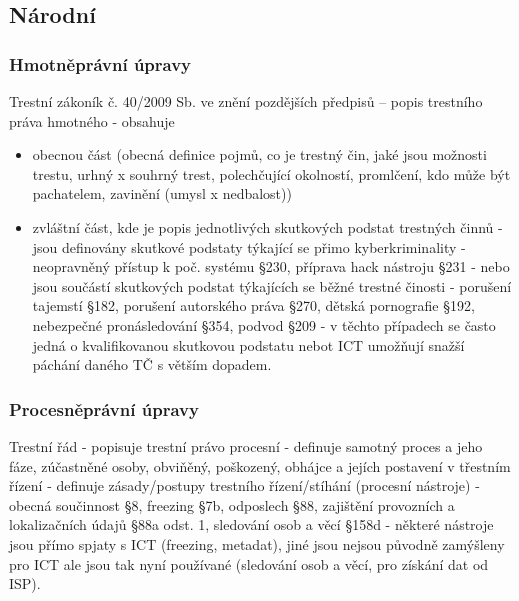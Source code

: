 \subsection{Národní}
\subsubsection{Hmotněprávní úpravy}
Trestní zákoník č. 40/2009 Sb. ve znění pozdějších předpisů -- popis trestního práva hmotného - obsahuje
\begin{itemize}
    \item obecnou část (obecná definice pojmů, co je trestný
čin, jaké jsou možnosti trestu, urhný x souhrný trest, polechčující okolností, promlčení, kdo může
být pachatelem, zavinění (umysl x nedbalost))
    \item zvláštní část, kde je popis jednotlivých
skutkových podstat trestných činnů - jsou definovány skutkové podstaty týkající se přimo
kyberkriminality - neopravněný přístup k poč. systému §230, příprava hack nástroju §231 - nebo
jsou součástí skutkových podstat týkajících se běžné trestné činosti - porušení tajemstí §182,
porušení autorského práva §270, dětská pornografie §192, nebezpečné pronásledování §354,
podvod §209 - v těchto případech se často jedná o kvalifikovanou skutkovou podstatu nebot ICT
umožňují snažší páchání daného TČ s větším dopadem.
\end{itemize} 


\subsubsection{Procesněprávní úpravy}
Trestní řád - popisuje trestní právo procesní - definuje samotný proces a jeho fáze, zúčastněné
osoby, obviňěný, poškozený, obhájce a jejích postavení v třestním řízení - definuje zásady/postupy
trestního řízení/stíhání (procesní nástroje) - obecná součinnost §8, freezing §7b, odposlech §88,
zajištění provozních a lokalizačních údajů §88a odst. 1, sledování osob a věcí §158d - některé
nástroje jsou přímo spjaty s ICT (freezing, metadat), jiné jsou nejsou původně zamýšleny pro ICT
ale jsou tak nyní používané (sledování osob a věcí, pro získání dat od ISP).

